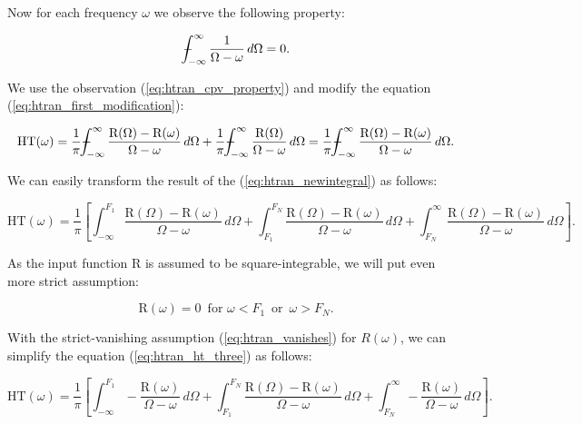 \documentclass[12pt,twoside,a4paper]{article}
\numberwithin{equation}{subsection}
\numberwithin{figure}{subsection}
\def\Xint#1{\mathchoice
{\XXint\displaystyle\textstyle{#1}}%
{\XXint\textstyle\scriptstyle{#1}}%
{\XXint\scriptstyle\scriptscriptstyle{#1}}%
{\XXint\scriptscriptstyle\scriptscriptstyle{#1}}%
\!\int}
\def\XXint#1#2#3{{\setbox0=\hbox{$#1{#2#3}{\int}$ }\vcenter{\hbox{$#2#3$ }}\kern-.6\wd0}}
\def\dashint{\Xint-}
\begin{document}
Now for each frequency $\omega$ we observe the following property:

\begin{equation} \label{eq:htran_cpv_property}
	\dashint_{ - \infty }^{\infty } \frac {1}{\Omega  - \omega } \,d\Omega =0 .
\end{equation}

We use the observation (\ref{eq:htran_cpv_property}) and modify the equation (\ref{eq:htran_first_modification}):

\begin{equation} \label{eq:htran_newintegral}
  \mathrm{HT}(\omega )
  = \frac{1}{\pi } {\dashint_{ - \infty }^{\infty } \frac {\mathrm{R}(\Omega ) - \mathrm{R}(\omega )}{\Omega  - \omega }\,d\Omega }
  + \frac{1}{\pi } {\dashint_{ - \infty }^{\infty } \frac {\mathrm{R}(\Omega )}{\Omega  - \omega }\,d\Omega }
  = \frac{1}{\pi } {\dashint_{ - \infty }^{\infty } \frac {\mathrm{R}(\Omega ) - \mathrm{R}(\omega )}{\Omega - \omega }\,d\Omega} . 
\end{equation}

We can easily transform the result of the (\ref{eq:htran_newintegral}) as follows:

\begin{equation} \label{eq:htran_ht_three}
  \mathrm{HT}(\omega ) = \frac{1}{\pi } \left[ 
    \int_{ -\infty }^{F_1} \frac {\mathrm{R}(\Omega ) - \mathrm{R}(\omega )}{\Omega  - \omega }\,d\Omega 
  + \int_{ F_1 }^{ F_N }   \frac {\mathrm{R}(\Omega ) - \mathrm{R}(\omega )}{\Omega  - \omega }\,d\Omega 
  + \int_{ F_N }^{ \infty} \frac {\mathrm{R}(\Omega ) - \mathrm{R}(\omega )}{\Omega  - \omega }\,d\Omega 
  \right] .
\end{equation}

As the input function R is assumed to be square-integrable, we will put even more strict assumption:

\begin{equation} \label{eq:htran_vanishes}
  \mathrm{R}(\omega) = 0 \, \text{ for } \omega < F_1 \, \text { or } \, \omega > F_N.  
\end{equation}

With the strict-vanishing assumption (\ref{eq:htran_vanishes}) for $R(\omega)$, we can simplify the equation (\ref{eq:htran_ht_three}) as
follows:

\begin{equation} \label{eq:htran_ht}
  \mathrm{HT}(\omega ) = \frac{1}{\pi } \left[ 
    \int_{ -\infty }^{F_1} - \frac {\mathrm{R}(\omega )}{\Omega - \omega }\,d\Omega
  + \int_{ F_1 }^{ F_N }     \frac {\mathrm{R}(\Omega ) - \mathrm{R}(\omega )}{\Omega - \omega }\,d\Omega 
  + \int_{ F_N }^{ \infty} - \frac {\mathrm{R}(\omega )}{\Omega - \omega }\,d\Omega 
  \right] .
\end{equation}
\end{document}
